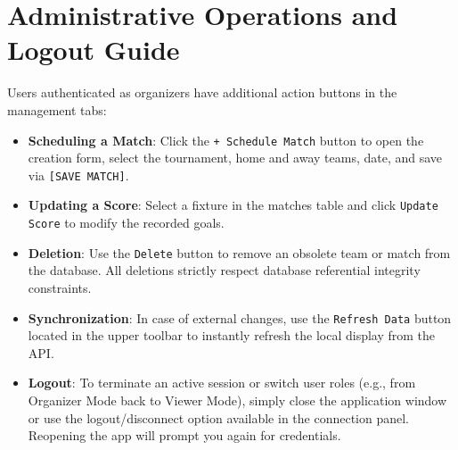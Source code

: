 \documentclass[11pt,a4paper]{article}
\begin{document}
\section{Administrative Operations and Logout Guide}

Users authenticated as organizers have additional action buttons in the management tabs:
\begin{itemize}
    \item \textbf{Scheduling a Match}: Click the \texttt{+ Schedule Match} button to open the creation form, select the tournament, home and away teams, date, and save via \texttt{[SAVE MATCH]}.
    \item \textbf{Updating a Score}: Select a fixture in the matches table and click \texttt{Update Score} to modify the recorded goals.
    \item \textbf{Deletion}: Use the \texttt{Delete} button to remove an obsolete team or match from the database. All deletions strictly respect database referential integrity constraints.
    \item \textbf{Synchronization}: In case of external changes, use the \texttt{Refresh Data} button located in the upper toolbar to instantly refresh the local display from the API.
    \item \textbf{Logout}: To terminate an active session or switch user roles (e.g., from Organizer Mode back to Viewer Mode), simply close the application window or use the logout/disconnect option available in the connection panel. Reopening the app will prompt you again for credentials.
\end{itemize}
\end{document}
